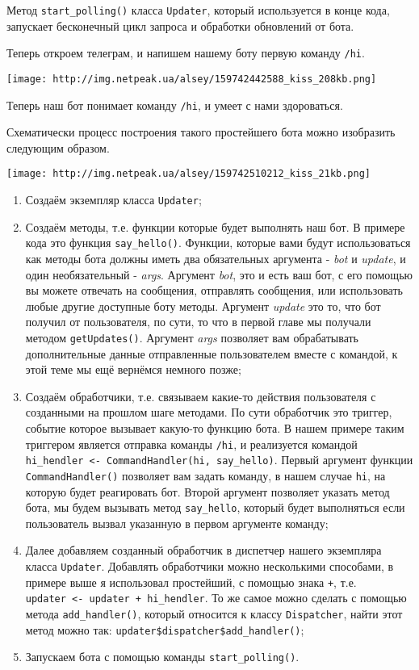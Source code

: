 \documentclass[
]{book}
\providecommand{\tightlist}{%
  \setlength{\itemsep}{0pt}\setlength{\parskip}{0pt}}
\begin{document}
Метод \texttt{start\_polling()} класса \texttt{Updater}, который используется в конце кода, запускает бесконечный цикл запроса и обработки обновлений от бота.

Теперь откроем телеграм, и напишем нашему боту первую команду \texttt{/hi}.

\texttt{[image: http://img.netpeak.ua/alsey/159742442588\_kiss\_208kb.png]}

Теперь наш бот понимает команду \texttt{/hi}, и умеет с нами здороваться.

Схематически процесс построения такого простейшего бота можно изобразить следующим образом.

\texttt{[image: http://img.netpeak.ua/alsey/159742510212\_kiss\_21kb.png]}

\begin{enumerate}
\def\labelenumi{\arabic{enumi}.}
\tightlist
\item
  Создаём экземпляр класса \texttt{Updater};
\item
  Создаём методы, т.е. функции которые будет выполнять наш бот. В примере кода это функция \texttt{say\_hello()}. Функции, которые вами будут использоваться как методы бота должны иметь два обязательных аргумента - \emph{bot} и \emph{update}, и один необязательный - \emph{args}. Аргумент \emph{bot}, это и есть ваш бот, с его помощью вы можете отвечать на сообщения, отправлять сообщения, или использовать любые другие доступные боту методы. Аргумент \emph{update} это то, что бот получил от пользователя, по сути, то что в первой главе мы получали методом \texttt{getUpdates()}. Аргумент \emph{args} позволяет вам обрабатывать дополнительные данные отправленные пользователем вместе с командой, к этой теме мы ещё вернёмся немного позже;
\item
  Создаём обработчики, т.е. связываем какие-то действия пользователя с созданными на прошлом шаге методами. По сути обработчик это триггер, событие которое вызывает какую-то функцию бота. В нашем примере таким триггером является отправка команды \texttt{/hi}, и реализуется командой \texttt{hi\_hendler\ \textless{}-\ CommandHandler(\textquotesingle{}hi\textquotesingle{},\ say\_hello)}. Первый аргумент функции \texttt{CommandHandler()} позволяет вам задать команду, в нашем случае \texttt{hi}, на которую будет реагировать бот. Второй аргумент позволяет указать метод бота, мы будем вызывать метод \texttt{say\_hello}, который будет выполняться если пользователь вызвал указанную в первом аргументе команду;
\item
  Далее добавляем созданный обработчик в диспетчер нашего экземпляра класса \texttt{Updater}. Добавлять обработчики можно несколькими способами, в примере выше я использовал простейший, с помощью знака \texttt{+}, т.е. \texttt{updater\ \textless{}-\ updater\ +\ hi\_hendler}. То же самое можно сделать с помощью метода \texttt{add\_handler()}, который относится к классу \texttt{Dispatcher}, найти этот метод можно так: \texttt{updater\$dispatcher\$add\_handler()};
\item
  Запускаем бота с помощью команды \texttt{start\_polling()}.
\end{enumerate}
\end{document}
